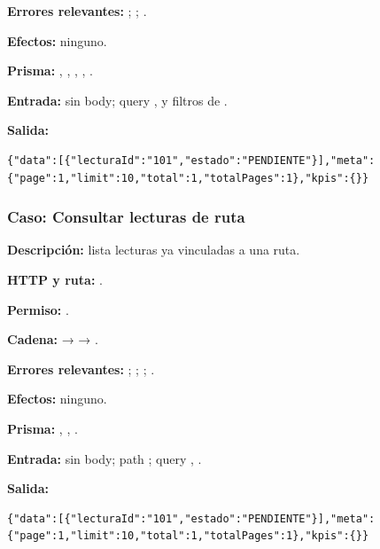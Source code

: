 \textbf{Errores relevantes:} \texttt{}; \texttt{}; \texttt{}.  

\textbf{Efectos:} ninguno.  

\textbf{Prisma:} \texttt{}, \texttt{}, \texttt{}, \texttt{}, \texttt{}.  

\textbf{Entrada:} sin body; query \texttt{}, \texttt{} y filtros de \texttt{}.  

\textbf{Salida:}


\begin{lstlisting}
{"data":[{"lecturaId":"101","estado":"PENDIENTE"}],"meta":{"page":1,"limit":10,"total":1,"totalPages":1},"kpis":{}}
\end{lstlisting}


\subsubsection{Caso: Consultar lecturas de ruta}


\textbf{Descripción:} lista lecturas ya vinculadas a una ruta.  

\textbf{HTTP y ruta:} \texttt{}.  

\textbf{Permiso:} \texttt{}.  

\textbf{Cadena:} \texttt{} → \texttt{} → \texttt{}.  

\textbf{Errores relevantes:} \texttt{}; \texttt{}; \texttt{}; \texttt{}.  

\textbf{Efectos:} ninguno.  

\textbf{Prisma:} \texttt{}, \texttt{}, \texttt{}.  

\textbf{Entrada:} sin body; path \texttt{}; query \texttt{}, \texttt{}.  

\textbf{Salida:}


\begin{lstlisting}
{"data":[{"lecturaId":"101","estado":"PENDIENTE"}],"meta":{"page":1,"limit":10,"total":1,"totalPages":1},"kpis":{}}
\end{lstlisting}


